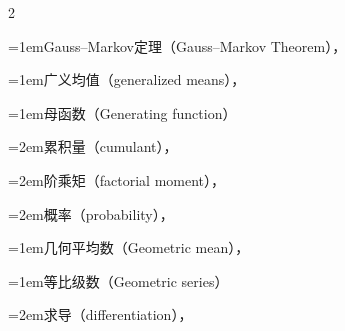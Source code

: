 \begin{multicols}{2}
\par\addvspace{2pt}
\par\noindent\hangindent=1em\hspace*{0em}\label{idx:451}Gauss–Markov定理（Gauss–Markov Theorem），\hyperref[idxocc:451:474]{\pageref*{idxocc:451:474}}\par
\par\addvspace{2pt}
\par\noindent\hangindent=1em\hspace*{0em}\label{idx:452}广义均值（generalized means），\hyperref[exercise:7.16]{\pageref*{exercise:7.16}}\par
\par\addvspace{2pt}
\par\noindent\hangindent=1em\hspace*{0em}\label{idx:453}母函数（Generating function）\par
\par\noindent\hangindent=2em\hspace*{1em}\label{idx:454}累积量（cumulant），\hyperref[idxocc:454:99]{\pageref*{idxocc:454:99}}\par
\par\noindent\hangindent=2em\hspace*{1em}\label{idx:455}阶乘矩（factorial moment），\hyperref[idxocc:455:99]{\pageref*{idxocc:455:99}}\par
\par\noindent\hangindent=2em\hspace*{1em}\label{idx:456}概率（probability），\hyperref[idxocc:456:99]{\pageref*{idxocc:456:99}}\par
\par\addvspace{2pt}
\par\noindent\hangindent=1em\hspace*{0em}\label{idx:457}几何平均数（Geometric mean），\hyperref[ex:4.7.8]{\pageref*{ex:4.7.8}}\par
\par\addvspace{2pt}
\par\noindent\hangindent=1em\hspace*{0em}\label{idx:458}等比级数（Geometric series）\par
\par\noindent\hangindent=2em\hspace*{1em}\label{idx:459}求导（differentiation），\hyperref[ex:2.4.7]{\pageref*{ex:2.4.7}}\par

\end{multicols}
